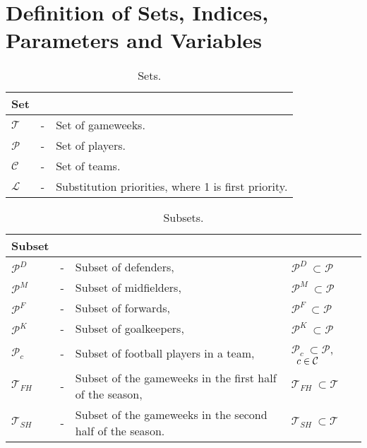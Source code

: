 \section{Definition of Sets, Indices, Parameters and Variables}\label{def_sets_ind_par_var}

\begin{table}[H]
\centering
\caption{Sets.}
\begin{tabular}{@{}lll@{}}
\toprule
Set           &   &                                                               \\ \midrule
$\mathcal{T}$ & - & Set of gameweeks.                                             \\
$\mathcal{P}$ & - & Set of players.                                              \\
$\mathcal{C}$ & - & Set of teams.                                                 \\
$\mathcal{L}$ & - & Substitution priorities, where 1 is first priority. \\
\bottomrule
\end{tabular}
\end{table}

\begin{table}[H]
\centering
\caption{Subsets.}
\begin{tabular}{@{}llll@{}}
\toprule
Subset            &   &                                       &                                                 \\ 
\midrule
$\mathcal{P}^{D}$ & - & Subset of defenders,                  & \quad  $\mathcal{P}^{D} \ \subset \mathcal{P}$  \\
$\mathcal{P}^{M}$ & - & Subset of midfielders,                & \quad $\mathcal{P}^{M} \ \subset \mathcal{P}$   \\
$\mathcal{P}^{F}$ & - & Subset of forwards,                   & \quad $\mathcal{P}^{F} \ \subset \mathcal{P}$   \\
$\mathcal{P}^{K}$ & - & Subset of goalkeepers,                & \quad $\mathcal{P}^{K} \ \subset \mathcal{P}$   \\
$\mathcal{P}_{c}$ & - & Subset of football players in a team, & \quad $\mathcal{P}_{c} \ \subset \mathcal{P}$, $\enskip c \in \mathcal{C}$  \\ 
$\mathcal{T}_{FH}$ & - & Subset of the gameweeks in the first half of the season,                & \quad $\mathcal{T}_{FH} \ \subset \mathcal{T}$   \\
$\mathcal{T}_{SH}$ & - & Subset of the gameweeks in the second half of the season.                & \quad $\mathcal{T}_{SH} \ \subset \mathcal{T}$   \\
\bottomrule
\end{tabular}
\end{table}


